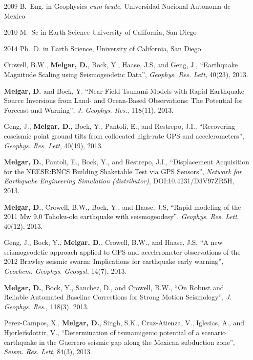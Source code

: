 \begin{frontmatter}
%
%
\begin{vitapage}
\begin{vita}
  \item[2009] B.~Eng. in Geophysics \emph{cum laude}, Universidad Nacional Autonoma de Mexico
  \item[2010] M.~Sc in Earth Science University of California, San Diego
  \item[2014] Ph.~D. in Earth Science, University of California, San Diego 
\end{vita}
\begin{publications}
\item Crowell, B.W., \textbf{Melgar, D.}, Bock, Y., Haase, J.S, and Geng, J., ``Earthquake Magnitude Scaling using Seismogeodetic Data'', \emph{Geophys. Res. Lett}, 40(23), 2013.
\item \textbf{Melgar, D.} and Bock, Y. ``Near-Field Tsunami Models with Rapid Earthquake Source Inversions from Land- and Ocean-Based Observations: The Potential for Forecast and Warning'', \emph{J. Geophys. Res.}, 118(11), 2013.
\item Geng, J., \textbf{Melgar, D.}, Bock, Y., Pantoli, E., and Restrepo, J.I., ``Recovering coseismic point ground tilts from collocated high-rate GPS and accelerometers'', \emph{Geophys. Res. Lett}, 40(19), 2013.
\item \textbf{Melgar, D.}, Pantoli, E., Bock, Y., and Restrepo, J.I., ``Displacement Acquisition for the NEESR:BNCS Building Shaketable Test via GPS Sensors'', \emph{Network for Earthquake Engineering Simulation (distributor)}, DOI:10.4231/D3V97ZR5H, 2013.
\item \textbf{Melgar, D.}, Crowell, B.W., Bock, Y., and Haase, J.S, ``Rapid modeling of the 2011 Mw 9.0 Tohoku-oki earthquake with seismogeodesy'', \emph{Geophys. Res. Lett}, 40(12), 2013.
\item Geng, J., Bock, Y., \textbf{Melgar, D.}, Crowell, B.W., and Haase, J.S, ``A new seismogeodetic approach applied to GPS and accelerometer observations of the 2012 Brawley seismic swarm: Implications for earthquake early warning'', \emph{Geochem. Geophys. Geosyst}, 14(7), 2013.
\item \textbf{Melgar, D.}, Bock, Y., Sanchez, D., and Crowell, B.W., ``On Robust and Reliable Automated Baseline Corrections for Strong Motion Seismology'', \emph{J. Geophys. Res.}, 118(3), 2013.
\item Perez-Campos, X., \textbf{Melgar, D.}, Singh, S.K., Cruz-Atienza, V., Iglesias, A., and Hjorleifsdottir, V., ``Determination of tsunamigenic potential of a scenario earthquake in the Guerrero seismic gap along the Mexican subduction zone'', \emph{Seism. Res. Lett}, 84(3), 2013.

\end{publications}
\end{vitapage}
\end{frontmatter}
